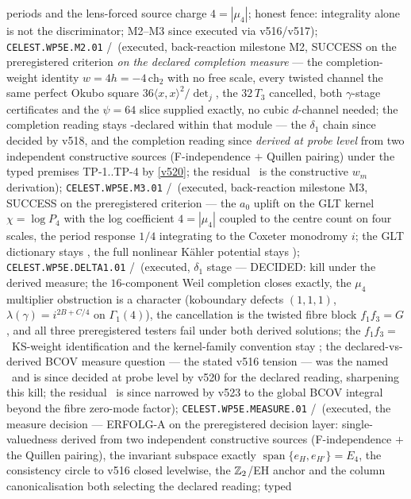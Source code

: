 periods and the lens-forced source charge $4=|\mu_4|$; honest fence: integrality alone is not
the discriminator; M2--M3 since executed via v516/v517);
\texttt{CELEST.WP5E.M2.01} \mE/\mC\ (executed, back-reaction milestone M2, SUCCESS on the
preregistered criterion \emph{on the declared completion measure} --- the completion-weight
identity $w=4h=-4\,\mathrm{ch}_2$ with no free scale, every twisted channel the same perfect
Okubo square $36\langle x,x\rangle^2/\det_j$, the $32\,T_3$ cancelled, both $\gamma$-stage
certificates and the $\psi=64$ slice supplied exactly, no cubic $d$-channel needed; the
completion reading stays \mC-declared within that module --- the $\delta_1$ chain since decided
by v518, and the completion reading since \emph{derived at probe level} from two independent
constructive sources (F-independence $+$ Quillen pairing) under the typed premises TP-1..TP-4
by \vref{v520}; the residual \mO\ is the constructive $w_m$ derivation);
\texttt{CELEST.WP5E.M3.01} \mE/\mC\ (executed, back-reaction milestone M3, SUCCESS on the
preregistered criterion --- the $a_0$ uplift on the GLT kernel $\chi=\log P_4$ with the log
coefficient $4=|\mu_4|$ coupled to the centre count on four scales, the period response $1/4$
integrating to the Coxeter monodromy $i$; the GLT dictionary stays \mC, the full nonlinear
K\"ahler potential stays \mO);
\texttt{CELEST.WP5E.DELTA1.01} \mE/\mC\ (executed, $\delta_1$ stage --- DECIDED: kill under
the derived measure; the $16$-component Weil completion closes exactly, the $\mu_4$ multiplier
obstruction is a character (koboundary defects $(1,1,1)$, $\lambda(\gamma)=i^{2B+C/4}$ on
$\Gamma_1(4)$), the cancellation is the twisted fibre block $f_1f_3=G$, and all three
preregistered testers fail under both derived solutions; the $f_1f_3=$~KS-weight
identification and the kernel-family convention stay \mC; the declared-vs-derived BCOV measure
question --- the stated v516 tension --- was the named \mO\ and is since decided at probe level
by v520 for the declared reading, sharpening this kill; the residual \mO\ is since narrowed
by v523 to the global BCOV integral beyond the fibre zero-mode factor);
\texttt{CELEST.WP5E.MEASURE.01} \mE/\mC\ (executed, the measure decision --- ERFOLG-A on the
preregistered decision layer: single-valuedness derived from two independent constructive
sources (F-independence $+$ the Quillen pairing), the invariant subspace exactly
$\operatorname{span}\{e_H,e_{H'}\}=E_4$, the consistency circle to v516 closed levelwise, the
$\mathbb Z_2$/EH anchor and the column canonicalisation both selecting the declared reading; typed
